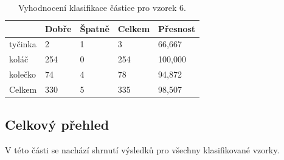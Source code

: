 \documentclass[11pt,twoside,a4paper,table]{book}
\begin{document}
\begin{table}[h]
\begin{center}
\begin{tabular}{lllll}
\rowcolor[HTML]{9B9B9B} 
\multicolumn{1}{|l|}{\cellcolor[HTML]{9B9B9B}Třída} & \multicolumn{1}{l|}{\cellcolor[HTML]{9B9B9B}Dobře} & \multicolumn{1}{l|}{\cellcolor[HTML]{9B9B9B}Špatně}  & \multicolumn{1}{l|}{\cellcolor[HTML]{9B9B9B}Celkem} & \multicolumn{1}{l|}{\cellcolor[HTML]{9B9B9B}Přesnost} \\ \hline
\multicolumn{1}{|l|}{tyčinka}                             & \multicolumn{1}{l|}{2}                             & \multicolumn{1}{l|}{1}                               & \multicolumn{1}{l|}{3}                              & \multicolumn{1}{l|}{66,667}                           \\ \hline
\multicolumn{1}{|l|}{koláč}                             & \multicolumn{1}{l|}{254}                           & \multicolumn{1}{l|}{0}                               & \multicolumn{1}{l|}{254}                            & \multicolumn{1}{l|}{100,000}                          \\ \hline
\multicolumn{1}{|l|}{kolečko}                             & \multicolumn{1}{l|}{74}                            & \multicolumn{1}{l|}{4}                               & \multicolumn{1}{l|}{78}                             & \multicolumn{1}{l|}{94,872}                           \\ \hline
\multicolumn{1}{|l|}{Celkem}                        & \multicolumn{1}{l|}{330}                           & \multicolumn{1}{l|}{5}                               & \multicolumn{1}{l|}{335}                            & \multicolumn{1}{l|}{98,507}                           \\ \hline
\end{tabular}
\end{center}
\caption{Vyhodnocení klasifikace částice pro vzorek 6.}
\label{tab:classresult7}
\end{table}

\newpage
\FloatBarrier
\subsection{Celkový přehled}
V této části se nachází shrnutí výsledků pro všechny klasifikované vzorky.
\end{document}
